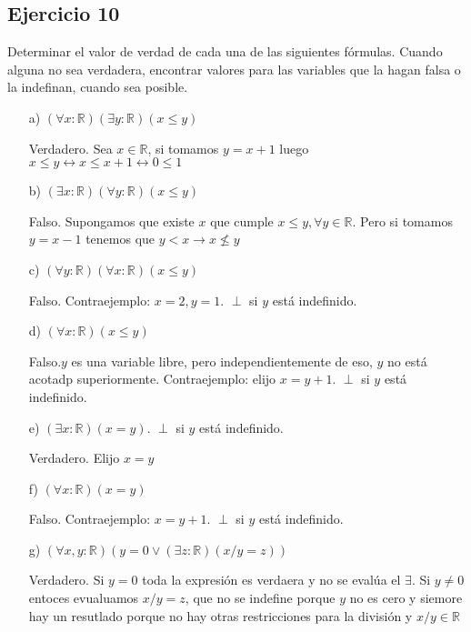 \documentclass[10pt,a4paper]{article}
\begin{document}
\subsection*{Ejercicio 10}

Determinar el valor de verdad de cada una de las siguientes fórmulas. Cuando alguna no sea
verdadera, encontrar valores para las variables que la hagan falsa o la indefinan, cuando sea posible.
\begin{enumerate}
\item[a)]$(\forall x : \mathbb{R})(\exists y : \mathbb{R})(x \leq y)$

Verdadero. Sea $x\in \mathbb{R}$, si tomamos $y=x+1$ luego $x\leq y \leftrightarrow x\leq x+1 \leftrightarrow 0\leq 1$

\item[b)]$(\exists x : \mathbb{R})(\forall y : \mathbb{R})(x \leq y)$

Falso. Supongamos que existe $x$ que cumple $x \leq y, \forall y\in \mathbb{R}$. Pero si tomamos $y=x-1$ tenemos que $y<x\rightarrow x\not \leq y$

\item[c)]$(\forall y : \mathbb{R})(\forall x : \mathbb{R})(x \leq y)$

Falso. Contraejemplo: $x=2,y=1$. $\perp$ si $y$ está indefinido.

\item[d)]$(\forall x : \mathbb{R})(x \leq y)$

Falso.$y$ es una variable libre, pero independientemente de eso, $y$ no está acotadp superiormente. Contraejemplo: elijo $x=y+1$. $\perp$ si $y$ está indefinido.

\item[e)]$(\exists x : \mathbb{R})(x = y)$. $\perp$ si $y$ está indefinido.

Verdadero. Elijo $x=y$

\item[f)]$(\forall x : \mathbb{R})(x = y)$

Falso. Contraejemplo: $x=y+1$. $\perp$ si $y$ está indefinido.

\item[g)]$(\forall x, y : \mathbb{R})(y = 0 \vee (\exists z : \mathbb{R})(x/y = z))$

Verdadero. Si $y=0$ toda la expresión es verdaera y no se evalúa el $\exists$. Si $y\not =0$ entoces evualuamos $x/y = z$, que no se indefine porque $y$ no es cero y siemore hay un resutlado porque no hay otras restricciones para la división y $x/y  \in \mathbb{R}$


\end{enumerate}
\end{document}
